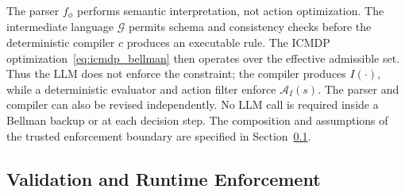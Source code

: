 \documentclass[journal]{IEEEtran}
\theoremstyle{definition}
\newcommand{\cA}{\mathcal{A}}
\newcommand{\cG}{\mathcal{G}}
\begin{document}
The parser $f_\phi$ performs semantic interpretation, not action optimization.
The intermediate language $\cG$ permits schema and consistency checks
before the deterministic compiler $c$ produces an executable rule. The ICMDP
optimization~\eqref{eq:icmdp_bellman} then operates over the effective
admissible set. Thus the LLM does not enforce the constraint; the compiler
produces $I(\cdot)$, while a deterministic evaluator and action filter enforce
$\cA_I(s)$. The parser and compiler can also be revised independently. No LLM call is
required inside a Bellman backup or at each decision step. The composition and
assumptions of the trusted enforcement boundary are specified in
Section~\ref{subsec:enforcement}.

\subsection{Validation and Runtime Enforcement}
\label{subsec:enforcement}
\end{document}
